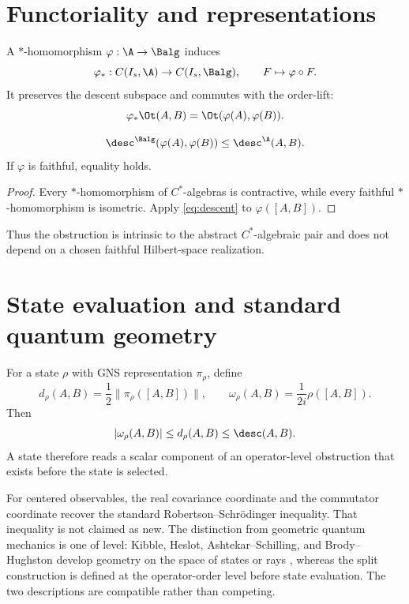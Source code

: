 \section{Functoriality and representations}
A $*$-homomorphism $\varphi:\A\to\Balg$ induces
\[
\varphi_*:C(I_s,\A)\to C(I_s,\Balg),\qquad F\mapsto \varphi\circ F.
\]
It preserves the descent subspace and commutes with the order-lift:
\[
\varphi_*\Ot(A,B)=\Ot(\varphi(A),\varphi(B)).
\]

\begin{theorem}\label{thm:functor}
\[
\desc^{\Balg}(\varphi(A),\varphi(B))\le \desc^{\A}(A,B).
\]
If $\varphi$ is faithful, equality holds.
\end{theorem}
\begin{proof}
Every $*$-homomorphism of $C^*$-algebras is contractive, while every faithful $*$-homomorphism is isometric. Apply \eqref{eq:descent} to $\varphi([A,B])$.
\end{proof}

Thus the obstruction is intrinsic to the abstract $C^*$-algebraic pair and does not depend on a chosen faithful Hilbert-space realization.

\section{State evaluation and standard quantum geometry}
For a state $\rho$ with GNS representation $\pi_\rho$, define
\[
d_\rho(A,B)=\frac12\|\pi_\rho([A,B])\|,
\qquad
\omega_\rho(A,B)=\frac{1}{2i}\rho([A,B]).
\]
Then
\begin{equation}\label{eq:statehier}
|\omega_\rho(A,B)|\le d_\rho(A,B)\le \desc(A,B).
\end{equation}
A state therefore reads a scalar component of an operator-level obstruction that exists before the state is selected.

For centered observables, the real covariance coordinate and the commutator coordinate recover the standard Robertson--Schr\"odinger inequality. That inequality is not claimed as new. The distinction from geometric quantum mechanics is one of level: Kibble, Heslot, Ashtekar--Schilling, and Brody--Hughston develop geometry on the space of states or rays \cite{ref3,ref4,ref5,ref6}, whereas the split construction is defined at the operator-order level before state evaluation. The two descriptions are compatible rather than competing.


